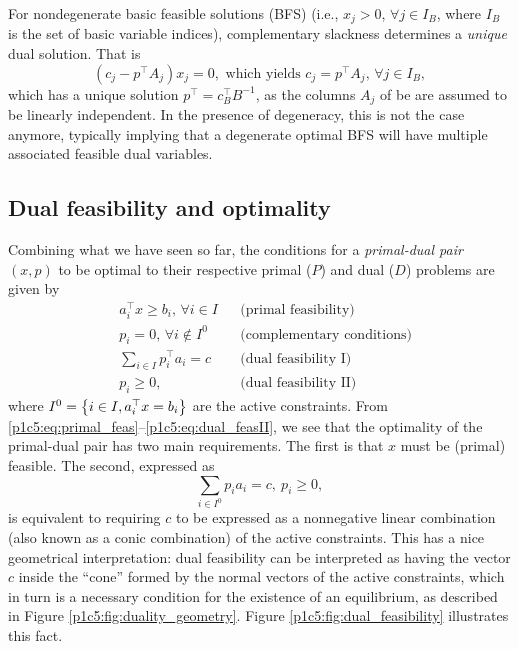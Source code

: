 For nondegenerate basic feasible solutions (BFS) (i.e., $x_j > 0$, $\forall j \in I_B$, where $I_B$ is the set of basic variable indices), complementary slackness determines a \emph{unique} dual solution. That is
%
\begin{equation*}
	(c_j - p^\top A_j)x_j = 0, \text{ which yields } c_j = p^\top A_j, \, \forall j \in I_B,
\end{equation*}
%
which has a unique solution $p^\top = c_B^\top B^{-1}$, as the columns $A_j$ of be are assumed to be linearly independent. In the presence of degeneracy, this is not the case anymore, typically implying that a degenerate optimal BFS will have multiple associated feasible dual variables.


\subsection{Dual feasibility and optimality}

Combining what we have seen so far, the conditions for a \emph{primal-dual pair} $(x,p)$ to be optimal to their respective primal ($P$) and dual ($D$) problems are given by 
%
\begin{align}
	& a_i^\top x \geq b_i, \, \forall i \in I & & \text{(primal feasibility)}\label{p1c5:eq:primal_feas} \\
	& p_i = 0, \, \forall i \notin I^0   & & \text{(complementary conditions)} \label{p1c5:eq:cc}\\
	& \sum_{i \in I} p_i^\top a_i = c & & \text{(dual feasibility I)} \label{p1c5:eq:dual_feasI} \\
	& p_i \geq 0, & & \text{(dual feasibility II)} \label{p1c5:eq:dual_feasII}
\end{align}
%
where $I^0 = \left\{ i \in I, a_i^\top x = b _i \right \}$ are the active constraints. From \eqref{p1c5:eq:primal_feas}--\eqref{p1c5:eq:dual_feasII}, we see that the optimality of the primal-dual pair has two main requirements. The first is that $x$ must be (primal) feasible. The second, expressed as 
%
\begin{equation*}
	\sum_{i \in I^0} p_ia_i = c, \ p_i \geq 0,
\end{equation*}
%
is equivalent to requiring $c$ to be expressed as a nonnegative linear combination (also known as a conic combination) of the active constraints. This has a nice geometrical interpretation: dual feasibility can be interpreted as having the vector $c$ inside the ``cone'' formed by the normal vectors of the active constraints, which in turn is a necessary condition for the existence of an equilibrium, as described in Figure \ref{p1c5:fig:duality_geometry}. Figure \ref{p1c5:fig:dual_feasibility} illustrates this fact.

